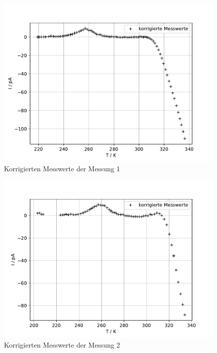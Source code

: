\begin{figure}
  \centering
  \includegraphics{build/korrigierte_werte_1.pdf}
  \caption{Korrigierten Messwerte der Messung 1}
  \label{fig:I_T_korrigiert_1}
\end{figure} %

\begin{figure}
  \centering
  \includegraphics{build/korrigierte_werte_2.pdf}
  \caption{Korrigierten Messwerte der Messung 2}
  \label{fig:I_T_korrigiert_2}
\end{figure} %